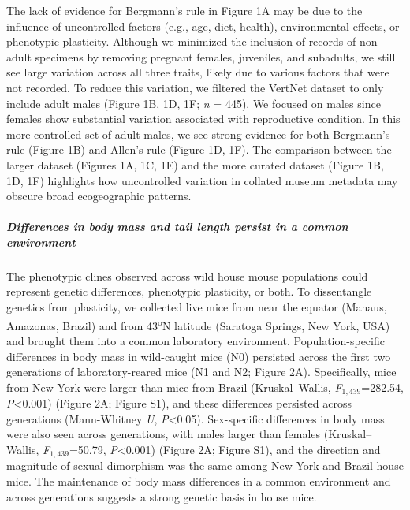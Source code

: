 \documentclass[]{article}
\let\oldsubparagraph\subparagraph
\renewcommand{\subparagraph}[1]{\oldsubparagraph{#1}\mbox{}}
\begin{document}
The lack of evidence for Bergmann's rule in Figure 1A may be due to the
influence of uncontrolled factors (e.g., age, diet, health),
environmental effects, or phenotypic plasticity. Although we minimized
the inclusion of records of non-adult specimens by removing pregnant
females, juveniles, and subadults, we still see large variation across
all three traits, likely due to various factors that were not recorded.
To reduce this variation, we filtered the VertNet dataset to only
include adult males (Figure 1B, 1D, 1F; \emph{n} = 445). We focused on
males since females show substantial variation associated with
reproductive condition. In this more controlled set of adult males, we
see strong evidence for both Bergmann's rule (Figure 1B) and Allen's
rule (Figure 1D, 1F). The comparison between the larger dataset (Figures
1A, 1C, 1E) and the more curated dataset (Figure 1B, 1D, 1F) highlights
how uncontrolled variation in collated museum metadata may obscure broad
ecogeographic patterns.

\vspace{2.5mm}

\hypertarget{differences-in-body-mass-and-tail-length-persist-in-a-common-environment}{%
\subparagraph{\texorpdfstring{\emph{Differences in body mass and tail
length persist in a common
environment}}{Differences in body mass and tail length persist in a common environment}}\label{differences-in-body-mass-and-tail-length-persist-in-a-common-environment}}

The phenotypic clines observed across wild house mouse populations could
represent genetic differences, phenotypic plasticity, or both. To
dissentangle genetics from plasticity, we collected live mice from near
the equator (Manaus, Amazonas, Brazil) and from 43\textsuperscript{o}N
latitude (Saratoga Springs, New York, USA) and brought them into a
common laboratory environment. Population-specific differences in body
mass in wild-caught mice (N0) persisted across the first two generations
of laboratory-reared mice (N1 and N2; Figure 2A). Specifically, mice
from New York were larger than mice from Brazil (Kruskal--Wallis,
\emph{F}\(_{1,439}\)=282.54, \emph{P}\textless{}0.001) (Figure 2A;
Figure S1), and these differences persisted across generations
(Mann-Whitney \emph{U}, \emph{P}\textless{}0.05). Sex-specific
differences in body mass were also seen across generations, with males
larger than females (Kruskal--Wallis, \emph{F}\(_{1,439}\)=50.79,
\emph{P}\textless{}0.001) (Figure 2A; Figure S1), and the direction and
magnitude of sexual dimorphism was the same among New York and Brazil
house mice. The maintenance of body mass differences in a common
environment and across generations suggests a strong genetic basis in
house mice.
\end{document}
